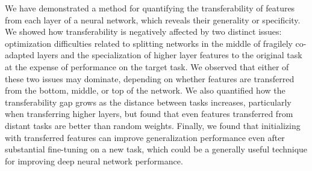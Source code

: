 We have demonstrated a method for quantifying the transferability of features from each layer of a neural network, which reveals their generality or specificity. We showed how transferability is negatively affected by two distinct issues: optimization difficulties related to splitting networks in the middle of fragilely co-adapted layers and the specialization of higher layer features to the original task at the expense of performance on the target task.
We observed that either of these two issues may dominate, depending on whether features are transferred from the bottom, middle, or top of the network.
We also quantified how the transferability gap grows as the distance between tasks increases, particularly when transferring higher layers, but found that even features transferred from distant tasks are better than random weights. Finally, we found that initializing with transferred features can improve generalization performance even after substantial fine-tuning on a new task, which could be a generally useful technique for improving deep neural network performance.

